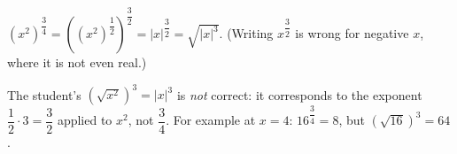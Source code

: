 $\left(x^2\right)^{\dfrac{3}{4}}=\left(\left(x^2\right)^{\dfrac{1}{2}}\right)^{\dfrac{3}{2}}=|x|^{\dfrac{3}{2}}=\boxed{\sqrt{|x|^3}}$. (Writing $x^{\dfrac{3}{2}}$ is wrong for negative $x$, where it is not even real.)

The student's $\left(\sqrt{x^2}\right)^3=|x|^3$ is \emph{not} correct: it corresponds to the exponent $\dfrac{1}{2}\cdot3=\dfrac{3}{2}$ applied to $x^2$, not $\dfrac{3}{4}$. For example at $x=4$: $16^{\dfrac{3}{4}}=8$, but $\left(\sqrt{16}\right)^3=64$.
